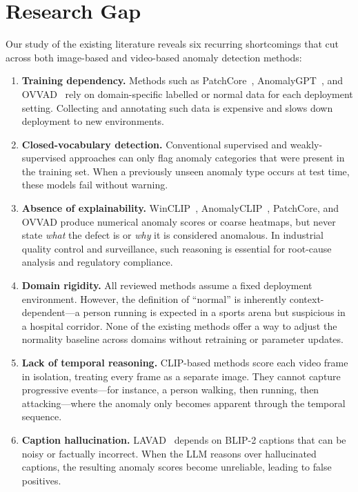 \section{Research Gap}
\label{sec:research_gap}

Our study of the existing literature reveals six recurring shortcomings that cut across both image-based and video-based anomaly detection methods:

\begin{enumerate}[leftmargin=*]
    \item \textbf{Training dependency.} Methods such as PatchCore~\cite{roth2022patchcore}, AnomalyGPT~\cite{gu2024anomalygpt}, and OVVAD~\cite{wu2024ovvad} rely on domain-specific labelled or normal data for each deployment setting. Collecting and annotating such data is expensive and slows down deployment to new environments.

    \item \textbf{Closed-vocabulary detection.} Conventional supervised and weakly-supervised approaches can only flag anomaly categories that were present in the training set. When a previously unseen anomaly type occurs at test time, these models fail without warning.

    \item \textbf{Absence of explainability.} WinCLIP~\cite{jeong2023winclip}, AnomalyCLIP~\cite{zhou2024anomalyclip}, PatchCore, and OVVAD produce numerical anomaly scores or coarse heatmaps, but never state \textit{what} the defect is or \textit{why} it is considered anomalous. In industrial quality control and surveillance, such reasoning is essential for root-cause analysis and regulatory compliance.

    \item \textbf{Domain rigidity.} All reviewed methods assume a fixed deployment environment. However, the definition of ``normal'' is inherently context-dependent---a person running is expected in a sports arena but suspicious in a hospital corridor. None of the existing methods offer a way to adjust the normality baseline across domains without retraining or parameter updates.

    \item \textbf{Lack of temporal reasoning.} CLIP-based methods score each video frame in isolation, treating every frame as a separate image. They cannot capture progressive events---for instance, a person walking, then running, then attacking---where the anomaly only becomes apparent through the temporal sequence.

    \item \textbf{Caption hallucination.} LAVAD~\cite{zanella2024lavad} depends on BLIP-2 captions that can be noisy or factually incorrect. When the LLM reasons over hallucinated captions, the resulting anomaly scores become unreliable, leading to false positives.
\end{enumerate}

